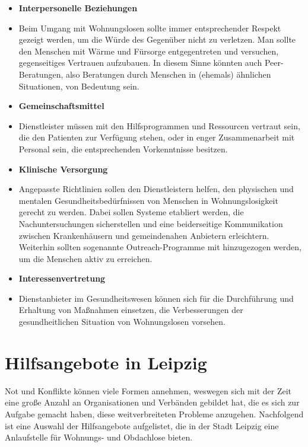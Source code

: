 \begin{itemize}
	\item \textbf{Interpersonelle Beziehungen}
	\item[] Beim Umgang mit Wohnungslosen sollte immer entsprechender Respekt gezeigt werden, um die Würde des Gegenüber nicht zu verletzen. Man sollte den Menschen mit Wärme und Fürsorge entgegentreten und versuchen, gegenseitiges Vertrauen aufzubauen. In diesem Sinne könnten auch Peer-Beratungen, also Beratungen durch Menschen in (ehemals) ähnlichen Situationen, von Bedeutung sein.
	\item \textbf{Gemeinschaftsmittel}
	\item[] Dienstleister müssen mit den Hilfsprogrammen und Ressourcen vertraut sein, die den Patienten zur Verfügung stehen, oder in enger Zusammenarbeit mit Personal sein, die entsprechenden Vorkenntnisse besitzen. \newpage
	\item \textbf{Klinische Versorgung}
	\item[] Angepasste Richtlinien sollen den Dienstleistern helfen, den physischen und mentalen Gesundheitsbedürfnissen von Menschen in Wohnungslosigkeit gerecht zu werden. Dabei sollen Systeme etabliert werden, die Nachuntersuchungen sicherstellen und eine beiderseitige Kommunikation zwischen Krankenhäusern und gemeindenahen Anbietern erleichtern. Weiterhin sollten sogenannte Outreach-Programme mit hinzugezogen werden, um die Menschen aktiv zu erreichen.
	\item \textbf{Interessenvertretung}
	\item[] Dienstanbieter im Gesundheitswesen können sich für die Durchführung und Erhaltung von Maßnahmen einsetzen, die Verbesserungen der gesundheitlichen Situation von Wohnungslosen vorsehen.
\end{itemize}


\section{Hilfsangebote in Leipzig}

Not und Konflikte können viele Formen annehmen, weswegen sich mit der Zeit eine große Anzahl an Organisationen und Verbänden gebildet hat, die es sich zur Aufgabe gemacht haben, diese weitverbreiteten Probleme anzugehen. Nachfolgend ist eine Auswahl der Hilfsangebote aufgelistet, die in der Stadt Leipzig eine Anlaufstelle für Wohnungs- und Obdachlose bieten.



